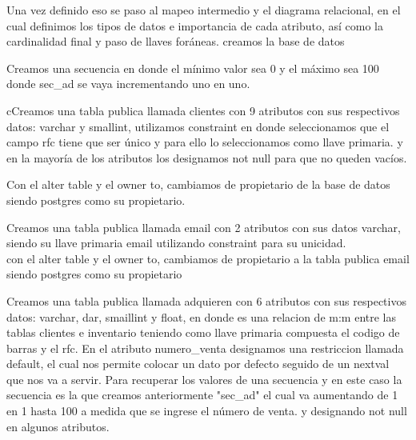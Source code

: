 \documentclass[letterpaper,12pt]{article}
\begin{document}
 	Una vez definido eso se paso al mapeo intermedio y el diagrama relacional, en el cual definimos los tipos de datos e importancia de cada atributo, así como la cardinalidad final y paso de llaves foráneas.
 	creamos la base de datos
 	
 	

 	
 	Creamos una secuencia en donde el mínimo valor sea 0 y el máximo sea 100 donde sec\_ad se vaya incrementando uno en uno.
 	
 	
 	
 	cCreamos una tabla publica llamada clientes con 9 atributos con sus respectivos datos: varchar y smallint, utilizamos constraint en donde seleccionamos que el campo rfc tiene que ser único y para ello lo seleccionamos como llave primaria.
 	y en la mayoría de los atributos los designamos not null para que no queden vacíos.
 	
 	
 	
 	Con el alter table y el owner to, cambiamos de propietario de la base de datos siendo postgres como su propietario.

 	
	
	Creamos una tabla publica llamada email con 2 atributos con sus datos varchar, siendo su llave primaria email utilizando constraint para su unicidad.\\
	
	
	
	con el alter table y el owner to, cambiamos de propietario a la tabla publica email siendo postgres como su propietario
	
	
	
	Creamos una tabla publica llamada adquieren con 6 atributos con sus respectivos datos: varchar, dar, smaillint y float, en donde es una relacion de m:m entre las tablas clientes e inventario teniendo como llave primaria compuesta el codigo de barras y el rfc.
	En el atributo numero\_venta designamos una restriccion llamada default, el cual nos permite colocar un dato por defecto seguido de un nextval que nos va a servir.
	Para recuperar los valores de una secuencia y en este caso la secuencia es la que creamos anteriormente "sec\_ad" el cual va aumentando de 1 en 1 hasta 100 a medida que se ingrese el número de venta.
	y designando not null en algunos atributos.
	
\end{document}
